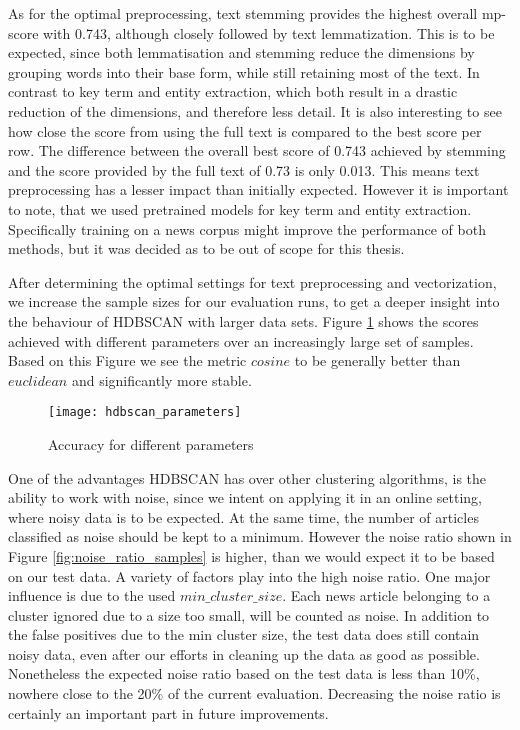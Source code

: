 As for the optimal preprocessing, text stemming provides the highest overall mp-score with 0.743, although closely followed by text lemmatization. This is to be expected, since both lemmatisation and stemming reduce the dimensions by grouping words into their base form, while still retaining most of the text.
In contrast to key term and entity extraction, which both result in a drastic reduction of the dimensions, and therefore less detail. It is also interesting to see how close the score from using the full text is compared to the best score per row. The difference between the overall best score of 0.743 achieved by stemming and the score provided by the full text of 0.73 is only 0.013. This means text preprocessing has a lesser impact than initially expected.   
However it is important to note, that we used pretrained models for key term and entity extraction.
Specifically training on a news corpus might improve the performance of both methods, but it was decided as to be out of scope for this thesis.

After determining the optimal settings for text preprocessing and vectorization, we increase the sample sizes for our evaluation runs, to get a deeper insight into the behaviour of HDBSCAN with larger data sets. Figure \ref{fig:hdbscan_parameters} shows the scores achieved with different parameters over an increasingly large set of samples. Based on this Figure we see the metric $cosine$ to be generally better than $euclidean$ and significantly more stable.

\begin{figure}[h]
    \centering
    \texttt{[image: hdbscan\_parameters]}
    \caption{Accuracy for different parameters}
    \label{fig:hdbscan_parameters}
\end{figure}

One of the advantages HDBSCAN has over other clustering algorithms, is the ability to work with noise, since we intent on applying it in an online setting, where noisy data is to be expected. At the same time, the number of articles classified as noise should be kept to a minimum. However the noise ratio shown in Figure \ref{fig:noise_ratio_samples} is higher, than we would expect it to be based on our test data. A variety of factors play into the high noise ratio. One major influence is due to the used $min\_cluster\_size$. Each news article belonging to a cluster ignored due to a size too small, will be counted as noise. In addition to the false positives due to the min cluster size, the test data does still contain noisy data, even after our efforts in cleaning up the data as good as possible. Nonetheless the expected noise ratio based on the test data is less than 10\%, nowhere close to the 20\% of the current evaluation. Decreasing the noise ratio is certainly an important part in future improvements.

